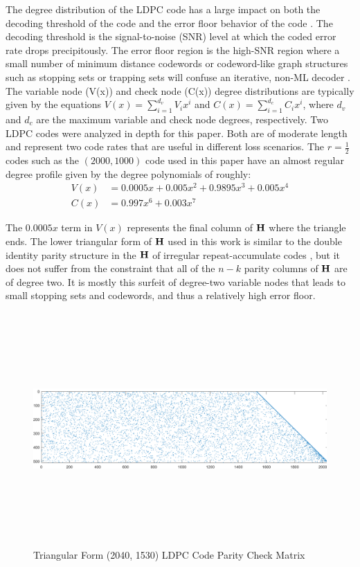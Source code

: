 \documentclass[conference]{IEEEtran}
\begin{document}
The degree distribution of the LDPC code has a large impact on both the decoding threshold of the code and the error floor behavior of the code \cite{luby-01}.  The decoding threshold is the signal-to-noise (SNR) level at which the coded error rate drops precipitously.  The error floor region is the high-SNR region where a small number of minimum distance codewords or codeword-like graph structures such as stopping sets or trapping sets will confuse an iterative, non-ML decoder \cite{cole_2-06}.  The variable node (V(x)) and check node (C(x)) degree distributions are typically given by the equations $V(x) = \sum_{i = 1}^{d_v} V_i x^i$ and $C(x) = \sum_{i = 1}^{d_c} C_i x^i$, where $d_v$ and $d_c$ are the maximum variable and check node degrees, respectively.  Two LDPC codes were analyzed in depth for this paper.  Both are of moderate length and represent two code rates that are useful in different loss scenarios.  The $r=\frac{1}{2}$ codes such as the $(2000, 1000)$ code used in this paper have an almost regular degree profile given by the degree polynomials of roughly:
\begin{align*}
  V(x) &= 0.0005x + 0.005x^2 + 0.9895x^3 + 0.005x^4 \\
  C(x) &= 0.997x^6 + 0.003x^7
\end{align*}

The $0.0005x$ term in $V(x)$ represents the final column of $\bf{H}$ where the triangle ends.  The lower triangular form of $\bf{H}$ used in this work is similar to the double identity parity structure in the $\bf{H}$ of irregular repeat-accumulate codes \cite{Jin-2000}, but it does not suffer from the constraint that all of the $n-k$ parity columns of $\bf{H}$ are of degree two.  It is mostly this surfeit of degree-two variable nodes that leads to small stopping sets and codewords, and thus a relatively high error floor.  

\begin{figure}[!ht]
\centering
\includegraphics[height=3.5in, width = \textwidth]{LDPC_matrix_triangular_2040_1530_cropped.png}
\caption{Triangular Form (2040, 1530) LDPC Code Parity Check Matrix  \label{fig:LDPC_matrix_triangular}}
\end{figure}
\end{document}
